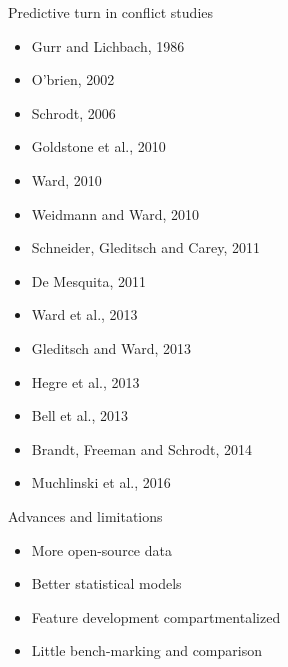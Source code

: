 \documentclass{beamer}
\begin{document}
\begin{frame}{Predictive turn in conflict studies}
\begin{minipage}{2.1in}
\begin{tiny}
\begin{itemize}
\item Gurr and Lichbach, 1986
\item O'brien, 2002
\item Schrodt, 2006
\item Goldstone et al., 2010
\item Ward, 2010
\item Weidmann and Ward, 2010
\item Schneider, Gleditsch and Carey, 2011
\end{itemize}
 \end{tiny}
\end{minipage}
\begin{minipage}{2.5in}
\begin{tiny}
\begin{itemize}
\item De Mesquita, 2011
\item Ward et al., 2013
\item Gleditsch and Ward, 2013
\item Hegre et al., 2013
\item Bell et al., 2013
\item Brandt, Freeman and Schrodt, 2014
\item Muchlinski et al., 2016
\end{itemize}
 \end{tiny}
\end{minipage}

\begin{block}{Advances and limitations} 
\begin{itemize}
\item More open-source data
\item Better statistical models
\item Feature development compartmentalized 
\item Little bench-marking and comparison
\end{itemize}
\end{block}
\end{frame}
\end{document}
